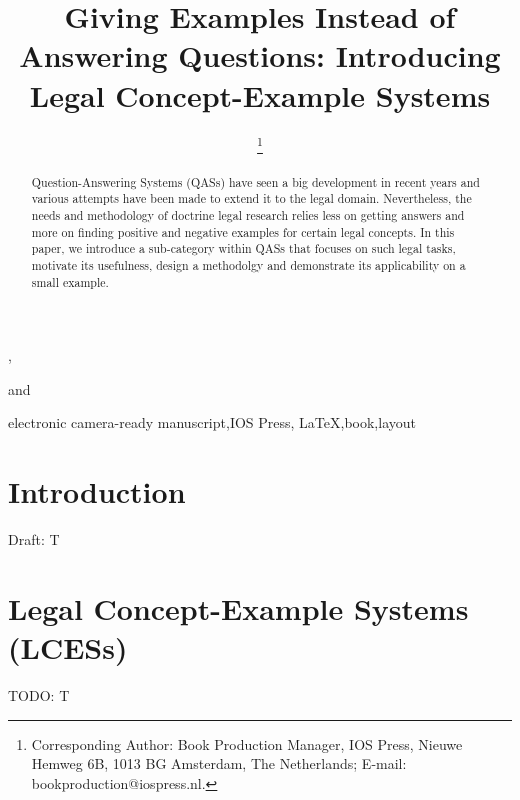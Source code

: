\documentclass{IOS-Book-Article}
\begin{document}
\begin{frontmatter}              %

\title{Giving Examples Instead of Answering Questions: Introducing Legal Concept-Example Systems}

\author[A]{ %
\thanks{Corresponding Author: Book Production Manager, IOS Press, Nieuwe Hemweg 6B,
1013 BG Amsterdam, The Netherlands; E-mail:
bookproduction@iospress.nl.}},
\author[B]{ }
and
\author[B]{ }

\address[A]{Book Production Department, IOS Press, The Netherlands}
\address[B]{Short Affiliation of Second Author and Third Author}

\begin{abstract}
Question-Answering Systems (QASs) have seen a big development in recent years and various attempts have been made to extend it to the legal domain. Nevertheless, the needs and methodology of doctrine legal research relies less on getting answers and more on finding positive and negative examples for certain legal concepts. In this paper, we introduce a sub-category within QASs that focuses on such legal tasks, motivate its usefulness, design a methodolgy and demonstrate its applicability on a small example.
\end{abstract}

\begin{keyword}
electronic camera-ready manuscript\sep IOS Press\sep
\LaTeX\sep book\sep layout
\end{keyword}
\end{frontmatter}

\thispagestyle{empty}
\pagestyle{empty}

\section{Introduction}

Draft: T



\section{Legal Concept-Example Systems (LCESs)}
\label{sec:lces}

TODO: T


\end{document}
